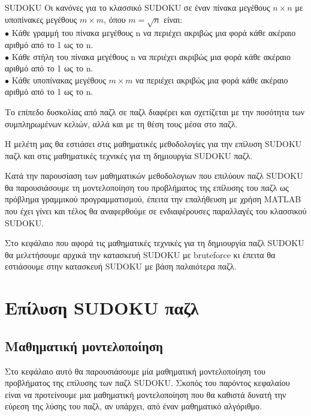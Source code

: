 \documentclass[12pt]{book}
\theoremstyle{definition}
\begin{document}
\begin{mytheorem}{SUDOKU}{}
	Οι κανόνες για το κλασσικό SUDOKU σε έναν πίνακα μεγέθους \(n \times n\) με υποπίνακες μεγέθους \(m \times m\), 	όπου \(m = \sqrt{n}\) είναι: \\
	\(\bullet\) Κάθε γραμμή του πίνακα μεγέθους n να περιέχει ακριβώς μια φορά κάθε ακέραιο αριθμό από το 1 ως το n. \\
	\(\bullet\) Κάθε στήλη του πίνακα μεγέθους n να περιέχει ακριβώς μια φορά κάθε ακέραιο αριθμό από το 1 ως το n. \\
	\(\bullet\) Κάθε υποπίνακας μεγέθους \(m \times m\) να περιέχει ακριβώς μια φορά κάθε ακέραιο αριθμό από το 1 ως το n. \\
\end{mytheorem}

Το επίπεδο δυσκολίας από παζλ σε παζλ διαφέρει και σχετίζεται με την ποσότητα των συμπληρωμένων κελιών, αλλά και με τη θέση τους μέσα στο παζλ. \par

Η μελέτη μας θα εστιάσει στις μαθηματικές μεθοδολογίες για την επίλυση SUDOKU παζλ και στις μαθηματικές τεχνικές για τη δημιουργία SUDOKU παζλ. \par 

Κατά την παρουσίαση των μαθηματικών μεθοδολογιων που επιλύουν παζλ SUDOKU θα παρουσιάσουμε τη μοντελοποίηση του προβλήματος της επίλυσης του παζλ ως
πρόβλημα γραμμικού προγραμματισμού, έπειτα την επαλήθευση με χρήση MATLAB που έχει γίνει και τέλος θα αναφερθούμε σε ενδιαφέρουσες παραλλαγές του κλασσικού SUDOKU. \par

Στο κεφάλαιο που αφορά τις μαθηματικές τεχνικές για τη δημιουργία παζλ SUDOKU θα μελετήσουμε αρχικά την κατασκευή SUDOKU με bruteforce κι έπειτα θα εστιάσουμε στην κατασκευή SUDOKU με βάση παλαιότερα παζλ. \par

\chapter{Επίλυση SUDOKU παζλ}
\section{Μαθηματική μοντελοποίηση}

Στο κεφάλαιο αυτό θα παρουσιάσουμε μία μαθηματική μοντελοποίηση του προβλήματος της επίλυσης των παζλ SUDOKU. Σκοπός του παρόντος κεφαλαίου είναι να προτείνουμε μια μαθηματική μοντελοποίηση που θα καθιστά δυνατή την εύρεση της λύσης του παζλ, αν υπάρχει, από έναν μαθηματικό αλγόριθμο. \par 
\end{document}
